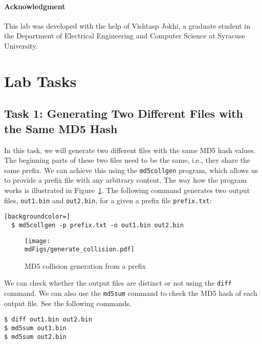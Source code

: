 \paragraph{Acknowledgment} This lab was developed with the help of Vishtasp
Jokhi, a graduate student in the Department of Electrical Engineering and
Computer Science at Syracuse University.



\section{Lab Tasks}


\subsection{Task 1: Generating Two Different Files with the Same MD5 Hash}


In this task, we will generate two different files with the same MD5 hash values. 
The beginning parts of these two files need to be the same, i.e., they share the same prefix.
We can achieve this using the \texttt{md5collgen} program, which allows us 
to provide a prefix file with any arbitrary content. 
The way how the program works is illustrated in Figure~\ref{md5:fig:md5collgen}.
The following command generates two output files,
\texttt{out1.bin}  and \texttt{out2.bin}, for a given a prefix file \texttt{prefix.txt}: 

\begin{lstlisting}[backgroundcolor=]
  $ md5collgen -p prefix.txt -o out1.bin out2.bin
\end{lstlisting}


\begin{figure}[htb]
	\centering
	\texttt{[image: \\mdFigs/generate\_collision.pdf]}
	\caption{MD5 collision generation from a prefix}
	\label{md5:fig:md5collgen}
\end{figure}
 

We can check whether the output files are distinct or not using the \texttt{diff} command.
We can also use the \texttt{md5sum} command to check the MD5 hash 
of each output file. See the following commands.

\begin{lstlisting}
$ diff out1.bin out2.bin
$ md5sum out1.bin
$ md5sum out2.bin
\end{lstlisting}
 
